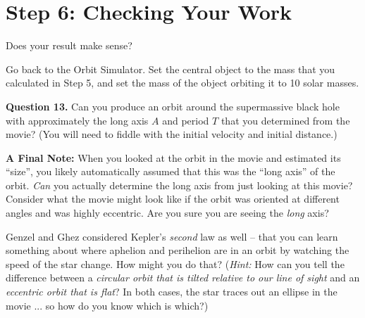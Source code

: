 \documentclass[11pt]{article}
\begin{document}
\section{Step 6: Checking Your Work}

Does your result make sense?

Go back to the Orbit Simulator. Set the central object to the mass that you calculated in Step 5, and set the mass of the object orbiting it to 10 solar masses. 


{\bf Question 13.} Can you produce an orbit around the supermassive black hole with approximately the long axis $A$ and period $T$ that you determined from the movie? (You will need to fiddle with the initial velocity and initial distance.)


\vspace{1in}

{\bf A Final Note:} When you looked at the orbit in the movie and estimated its “size”, you likely automatically assumed that this was the “long axis” of the orbit. {\it Can} you actually determine the long axis from just looking at this movie? Consider what the movie might look like if the orbit was oriented at different angles and was highly eccentric. Are you sure you are seeing the {\it long} axis?

Genzel and Ghez considered Kepler’s {\it second} law as well -- that you can learn something about where aphelion and perihelion are in an orbit by watching the speed of the star change. How might you do that? ({\it Hint:} How can you tell the difference between a {\it circular orbit that is tilted relative to our line of sight} and an {\it eccentric orbit that is flat}? In both cases, the star traces out an ellipse in the movie ... so how do you know which is which?)
\end{document}

